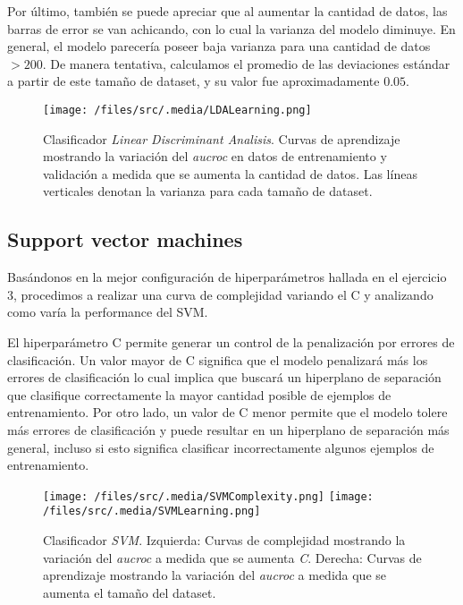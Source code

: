 Por último, también se puede apreciar que al aumentar la cantidad de datos, las barras de error se van achicando, con lo cual la varianza del modelo diminuye. En general, el modelo parecería poseer baja varianza para una cantidad de datos $> 200$. De manera tentativa, calculamos el promedio de las deviaciones estándar a partir de este tamaño de dataset, y su valor fue aproximadamente $0.05$.

\begin{figure}[!htbp]
    \centering
    \texttt{[image: /files/src/.media/LDALearning.png]}
    \caption{Clasificador \textit{Linear Discriminant Analisis}. Curvas de aprendizaje mostrando la variación del \textit{aucroc} en datos de entrenamiento y validación a medida que se aumenta la cantidad de datos. Las líneas verticales denotan la varianza para cada tamaño de dataset.}
    \label{LDALearning}
\end{figure}

\subsection{Support vector machines}

Basándonos en la mejor configuración de hiperparámetros hallada en el ejercicio 3, procedimos a realizar una curva de complejidad variando el C y analizando como varía la performance del SVM. 

El hiperparámetro C permite generar un control de la penalización por errores de clasificación. Un valor mayor de C significa que el modelo penalizará más los errores de clasificación lo cual implica que buscará un hiperplano de separación que clasifique correctamente la mayor cantidad posible de ejemplos de entrenamiento. Por otro lado, un valor de C menor permite que el modelo tolere más errores de clasificación y puede resultar en un hiperplano de separación más general, incluso si esto significa clasificar incorrectamente algunos ejemplos de entrenamiento.

\begin{figure}[!htbp] 
    \centering
    \texttt{[image: /files/src/.media/SVMComplexity.png]}
    \texttt{[image: /files/src/.media/SVMLearning.png]}
    \caption{Clasificador \textit{SVM}. Izquierda: Curvas de complejidad mostrando la variación del \textit{aucroc} a medida que se aumenta \textit{C}. Derecha: Curvas de aprendizaje mostrando la variación del \textit{aucroc} a medida que se aumenta el tamaño del dataset.}
    \label{SVM}
\end{figure}

